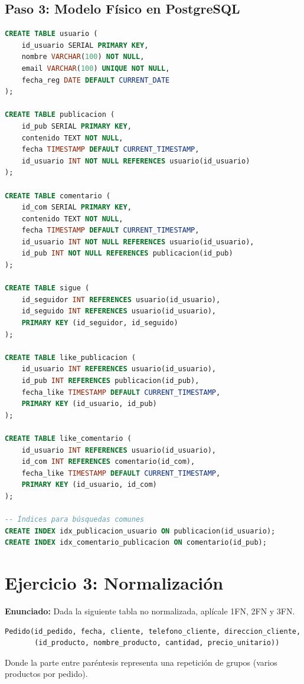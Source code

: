 \documentclass[12pt,a4paper,openany,oneside]{book}
\begin{document}
\subsection{Paso 3: Modelo Físico en PostgreSQL}
\begin{lstlisting}[language=SQL]
CREATE TABLE usuario (
    id_usuario SERIAL PRIMARY KEY,
    nombre VARCHAR(100) NOT NULL,
    email VARCHAR(100) UNIQUE NOT NULL,
    fecha_reg DATE DEFAULT CURRENT_DATE
);

CREATE TABLE publicacion (
    id_pub SERIAL PRIMARY KEY,
    contenido TEXT NOT NULL,
    fecha TIMESTAMP DEFAULT CURRENT_TIMESTAMP,
    id_usuario INT NOT NULL REFERENCES usuario(id_usuario)
);

CREATE TABLE comentario (
    id_com SERIAL PRIMARY KEY,
    contenido TEXT NOT NULL,
    fecha TIMESTAMP DEFAULT CURRENT_TIMESTAMP,
    id_usuario INT NOT NULL REFERENCES usuario(id_usuario),
    id_pub INT NOT NULL REFERENCES publicacion(id_pub)
);

CREATE TABLE sigue (
    id_seguidor INT REFERENCES usuario(id_usuario),
    id_seguido INT REFERENCES usuario(id_usuario),
    PRIMARY KEY (id_seguidor, id_seguido)
);

CREATE TABLE like_publicacion (
    id_usuario INT REFERENCES usuario(id_usuario),
    id_pub INT REFERENCES publicacion(id_pub),
    fecha_like TIMESTAMP DEFAULT CURRENT_TIMESTAMP,
    PRIMARY KEY (id_usuario, id_pub)
);

CREATE TABLE like_comentario (
    id_usuario INT REFERENCES usuario(id_usuario),
    id_com INT REFERENCES comentario(id_com),
    fecha_like TIMESTAMP DEFAULT CURRENT_TIMESTAMP,
    PRIMARY KEY (id_usuario, id_com)
);

-- Índices para búsquedas comunes
CREATE INDEX idx_publicacion_usuario ON publicacion(id_usuario);
CREATE INDEX idx_comentario_publicacion ON comentario(id_pub);
\end{lstlisting}

\section{Ejercicio 3: Normalización}
\textbf{Enunciado:} Dada la siguiente tabla no normalizada, aplícale 1FN, 2FN y 3FN.

\begin{verbatim}
Pedido(id_pedido, fecha, cliente, telefono_cliente, direccion_cliente,
       (id_producto, nombre_producto, cantidad, precio_unitario))
\end{verbatim}
Donde la parte entre paréntesis representa una repetición de grupos (varios productos por pedido).
\end{document}
